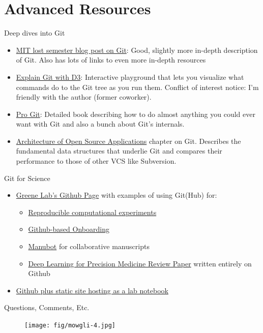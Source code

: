 \documentclass[pdf]{beamer} %
\begin{document}
\section{Advanced Resources}
\begin{frame}[t]{Deep dives into Git}
    \begin{itemize}
        \item \href{https://missing.csail.mit.edu/2020/version-control/}{MIT lost semester blog post on Git}: Good, slightly more in-depth description of Git. Also has lots of links to even more in-depth resources
        \item \href{https://onlywei.github.io/explain-git-with-d3/}{Explain Git with D3}: Interactive playground that lets you visualize what commands do to the Git tree as you run them. Conflict of interest notice: I'm friendly with the author (former coworker).
        \item \href{https://git-scm.com/book/en/v2}{Pro Git}: Detailed book describing how to do almost anything you could ever want with Git and also a bunch about Git's internals.
        \item \href{https://www.aosabook.org/en/git.html}{Architecture of Open Source Applications} chapter on Git. Describes the fundamental data structures that underlie Git and compares their performance to those of other VCS like Subversion.
    \end{itemize} 
\end{frame}

\begin{frame}[t]{Git for Science}
    \begin{itemize}
        \item \href{https://www.github.com/greenelab}{Greene Lab's Github Page} with examples of using Git(Hub) for:
        \begin{itemize}
            \item \href{https://github.com/greenelab/continuous_analysis}{Reproducible computational experiments}
            \item \href{https://www.github.com/greenelab/onboarding}{Github-based Onboarding}
            \item \href{https://www.github.com/greenelab/deep-review\#manubot}{Manubot} for collaborative manuscripts
            \item \href{https://www.github.com/greenelab/deep-review}{Deep Learning for Precision Medicine Review Paper} written entirely on Github
        \end{itemize}
        \item \href{http://notebook.madsenlab.org/labnotebook.html}{Github plus static site hosting as a lab notebook}
    \end{itemize}
\end{frame}

\begin{frame}[t]{Questions, Comments, Etc.}
    \begin{figure}[htpb]
        \centering
        \texttt{[image: fig/mowgli-4.jpg]}
        \caption{}
        \label{fig:}
    \end{figure}
\end{frame}
\end{document}
